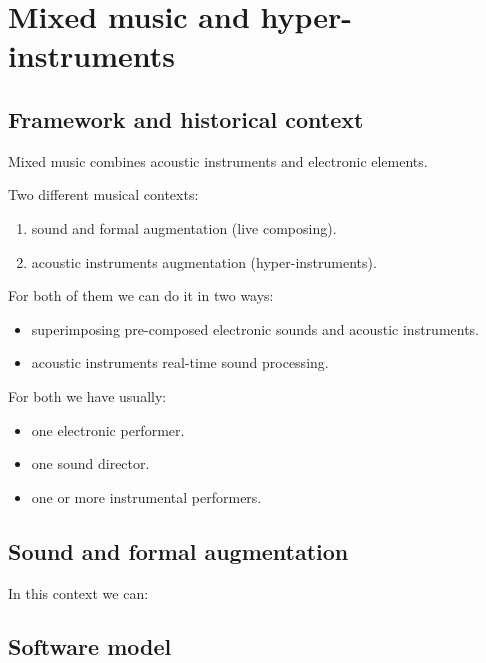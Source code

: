 \chapter{Mixed music and hyper-instruments}\label{mixed-music-and-hyper-instruments}

\section{Framework and historical context}\label{framework-and-historical-context}

Mixed music combines acoustic instruments and electronic elements.

Two different musical contexts:

\begin{enumerate}
\def\labelenumi{\arabic{enumi}.}
\tightlist
\item sound and formal augmentation (live composing).
\item acoustic instruments augmentation (hyper-instruments).
\end{enumerate}

For both of them we can do it in two ways:

\begin{itemize}
\tightlist
\item superimposing pre-composed electronic sounds and acoustic instruments.
\item acoustic instruments real-time sound processing.
\end{itemize}

For both we have usually:

\begin{itemize}
\tightlist
\item one electronic performer.
\item one sound director.
\item one or more instrumental performers.
\end{itemize}

\section{Sound and formal augmentation}\label{sound-and-formal-augmentation}

In this context we can:


\section{Software model}\label{software-model}
